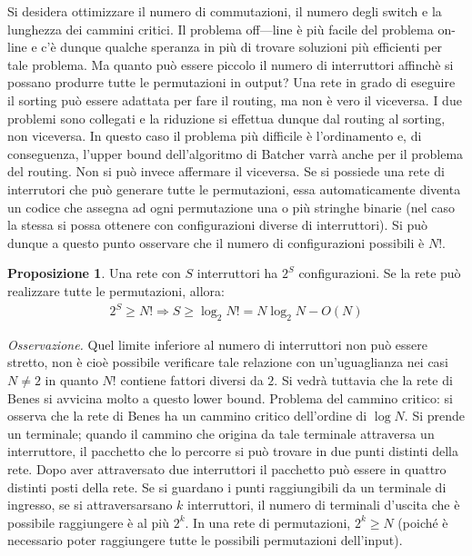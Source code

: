 \documentclass[a4paper,portrait,12pt]{article}
\theoremstyle{definition}
\newtheorem{proposition}{Proposizione}
\begin{document}
Si desidera ottimizzare il numero di commutazioni, il numero degli switch e la lunghezza dei cammini
critici. Il problema off—line è più facile del problema on-line e c’è dunque qualche speranza in più di trovare soluzioni più efficienti per tale problema.
Ma quanto può essere piccolo il numero di interruttori affinchè si possano produrre tutte le permutazioni in output?
Una rete in grado di eseguire il sorting può essere adattata per fare il routing, ma non è vero il viceversa.
I due problemi sono collegati e la riduzione si effettua dunque dal routing al sorting, non viceversa.
In questo caso il problema più difficile è l’ordinamento e, di conseguenza, l’upper bound dell’algoritmo di Batcher varrà anche per il problema del routing.
Non si può invece affermare il viceversa.
Se si possiede una rete di interrutori che può generare tutte le permutazioni, essa automaticamente diventa un codice che assegna ad ogni permutazione una o più stringhe binarie (nel caso la stessa si possa ottenere con configurazioni diverse di interruttori).
Si può dunque a questo punto osservare che il numero di configurazioni possibili è $N!$.

\begin{proposition}
Una rete con $S$ interruttori ha $2^S$ configurazioni.
Se la rete può realizzare tutte le permutazioni, allora:
\begin{gather*}
2^S \ge N! \Rightarrow S \ge \log_2 N! = N \log_2 N - O(N)
\end{gather*}
\end{proposition}

\textit{Osservazione.} Quel limite inferiore al numero di interruttori non può essere stretto, non è cioè possibile verificare tale relazione con un’uguaglianza nei casi $N \neq 2$ in quanto $N!$ contiene fattori diversi da $2$.
Si vedrà tuttavia che la rete di Benes si avvicina molto a questo lower bound.
Problema del cammino critico: si osserva che la rete di Benes ha un cammino critico dell’ordine di $\log N$.
Si prende un terminale; quando il cammino che origina da tale terminale attraversa un interruttore, il pacchetto che lo percorre si può trovare in due punti distinti della rete.
Dopo aver attraversato due interruttori il pacchetto può essere in quattro distinti posti della rete.
Se si guardano i punti raggiungibili da un terminale di ingresso, se si attraversarsano $k$ interruttori, il numero di terminali d’uscita che è possibile raggiungere è al più $2^k$.
In una rete di permutazioni, $2^k \ge N$ (poiché è necessario poter raggiungere tutte le possibili permutazioni dell’input).
\end{document}
